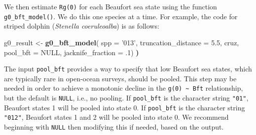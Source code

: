 \documentclass[
]{book}
\newenvironment{Shaded}{\begin{snugshade}}{\end{snugshade}}
\newcommand{\CommentTok}[1]{\textcolor[rgb]{0.56,0.35,0.01}{\textit{#1}}}
\newcommand{\DataTypeTok}[1]{\textcolor[rgb]{0.13,0.29,0.53}{#1}}
\newcommand{\ErrorTok}[1]{\textcolor[rgb]{0.64,0.00,0.00}{\textbf{#1}}}
\newcommand{\FloatTok}[1]{\textcolor[rgb]{0.00,0.00,0.81}{#1}}
\newcommand{\KeywordTok}[1]{\textcolor[rgb]{0.13,0.29,0.53}{\textbf{#1}}}
\newcommand{\NormalTok}[1]{#1}
\newcommand{\OperatorTok}[1]{\textcolor[rgb]{0.81,0.36,0.00}{\textbf{#1}}}
\newcommand{\OtherTok}[1]{\textcolor[rgb]{0.56,0.35,0.01}{#1}}
\newcommand{\StringTok}[1]{\textcolor[rgb]{0.31,0.60,0.02}{#1}}
\begin{document}
\begin{Shaded}
\end{Shaded}

We then estimate \texttt{Rg(0)} for each Beaufort sea state using the function \texttt{g0\_bft\_model()}. We do this one species at a time. For example, the code for striped dolphin (\emph{Stenella coeruleoalba}) is as follows:

\begin{Shaded}
\begin{Highlighting}[]
\NormalTok{g0_result <-}\StringTok{ }
\StringTok{  }\KeywordTok{g0_bft_model}\NormalTok{(}
  \DataTypeTok{spp =} \StringTok{'013'}\NormalTok{,}
  \DataTypeTok{truncation_distance =} \FloatTok{5.5}\NormalTok{,}
\NormalTok{  cruz,}
  \DataTypeTok{pool_bft =} \OtherTok{NULL}\NormalTok{, }
  \DataTypeTok{jacknife_fraction =} \FloatTok{.1}\NormalTok{)}
\ErrorTok{)}
\end{Highlighting}
\end{Shaded}

The input \texttt{pool\_bft} provides a way to specify that low Beaufort sea states, which are typically rare in open-ocean surveys, should be pooled. This step may be needed in order to achieve a monotonic decline in the \texttt{g(0)\ \textasciitilde{}\ Bft} relationship, but the default is \texttt{NULL}, i.e., no pooling. If \texttt{pool\_bft} is the character string \texttt{"01"}, Beaufort states 1 will be pooled into state 0. If \texttt{pool\_bft} is the character string \texttt{"012"}, Beaufort states 1 and 2 will be pooled into state 0. We recommend beginning with \texttt{NULL} then modifying this if needed, based on the output.
\end{document}
